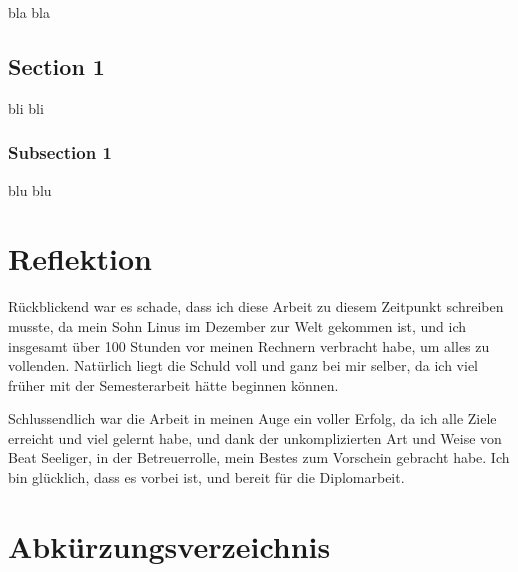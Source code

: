 \documentclass[abstracton, listof=totocnumbered,
bibliography=totocnumbered]{scrreprt}
\begin{document}
  bla bla
  
  \section{Section 1}

  bli bli 
  
  \subsection{Subsection 1}
  
  blu blu 
  
  \chapter{Reflektion}
  
  Rückblickend war es schade, dass ich diese Arbeit zu diesem Zeitpunkt
  schreiben musste, da mein Sohn Linus im Dezember zur Welt gekommen ist, und
  ich insgesamt über 100 Stunden vor meinen Rechnern verbracht habe, um alles
  zu vollenden. Natürlich liegt die Schuld voll und ganz bei mir selber, da ich
  viel früher mit der Semesterarbeit hätte beginnen können.
  
  Schlussendlich war die Arbeit in meinen Auge ein voller Erfolg, da ich alle
  Ziele erreicht und viel gelernt habe, und dank der unkomplizierten Art und Weise von
  Beat Seeliger, in der Betreuerrolle, mein Bestes zum Vorschein gebracht habe.
  Ich bin glücklich, dass es vorbei ist, und bereit für die Diplomarbeit.
  
  
  \appendix
  
%  
  
  
  \chapter{Abkürzungsverzeichnis}
  \begin{acronym}
    \setlength{\itemsep}{-\parsep}
  \end{acronym}
  
\end{document}
